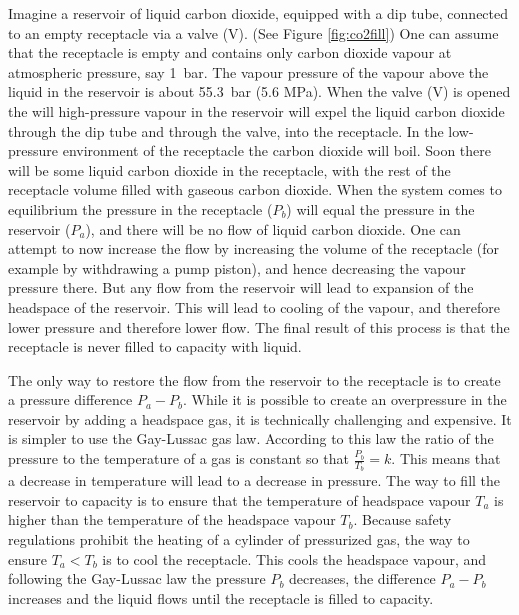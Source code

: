 Imagine a reservoir of liquid carbon dioxide, equipped with a dip tube,
connected to an empty receptacle via a valve (V). (See Figure \ref{fig:co2fill})
One can assume that the receptacle is empty and contains only carbon dioxide
vapour at atmospheric pressure, say \SI{1}{\bar}. The vapour pressure of the
vapour above the liquid in the reservoir is about \SI{55.3}{\bar} (5.6 MPa).
When the valve (V) is opened the will high-pressure vapour in the reservoir will
expel the liquid carbon dioxide through the dip tube and through the valve, into
the receptacle. In the low-pressure environment of the receptacle the carbon
dioxide will boil. Soon there will be some liquid carbon dioxide in the
receptacle, with the rest of the receptacle volume filled with gaseous carbon
dioxide. When the system comes to equilibrium the pressure in the receptacle
($P_b$) will equal the pressure in the reservoir ($P_a$), and there will be no
flow of liquid carbon dioxide. One can attempt to now increase the flow by
increasing the volume of the receptacle (for example by withdrawing a pump
piston), and hence decreasing the vapour pressure there. But any flow from the
reservoir will lead to expansion of the headspace of the reservoir. This will
lead to cooling of the vapour, and therefore lower pressure and therefore lower
flow. The final result of this process is that the receptacle is never filled to
capacity with liquid.

The only way to restore the flow from the reservoir to the receptacle is to
create a pressure difference $P_a - P_b$. While it is possible to create an
overpressure in the reservoir by adding a headspace gas, it is technically
challenging and expensive. It is simpler to use the Gay-Lussac gas law.
According to this law the ratio of the pressure to the temperature of a gas is
constant so that $\frac{P_b}{T_b} = k$. This means that a decrease in
temperature will lead to a decrease in pressure. The way to fill the reservoir
to capacity is to ensure that the temperature of headspace vapour $T_a$ is higher
than the temperature of the headspace vapour $T_b$. Because safety regulations
prohibit the heating of a cylinder of pressurized gas, the way to ensure $T_a <
T_b$ is to cool the receptacle. This cools the headspace vapour, and following
the Gay-Lussac law the pressure $P_b$ decreases, the difference $P_a - P_b$
increases and the liquid flows until the receptacle is filled to capacity.
 
